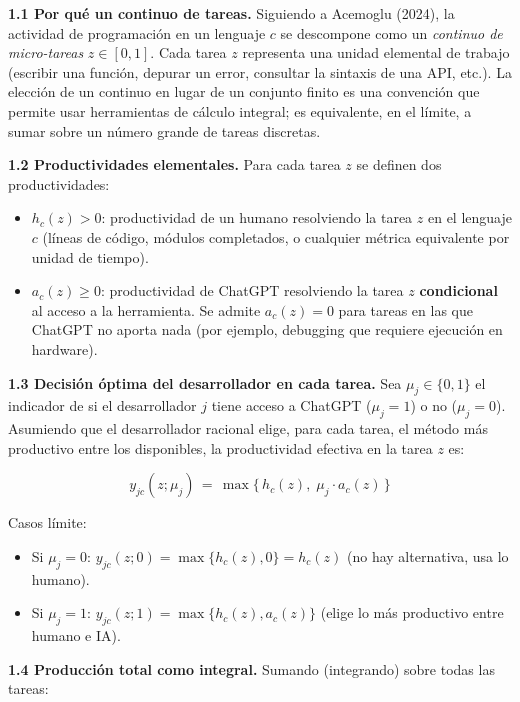 \documentclass[11pt,a4paper]{article}
\theoremstyle{definition}
\begin{document}
\textbf{1.1 Por qué un continuo de tareas.} Siguiendo a Acemoglu (2024), la actividad de programación en un lenguaje $c$ se descompone como un \textit{continuo de micro-tareas} $z \in [0, 1]$. Cada tarea $z$ representa una unidad elemental de trabajo (escribir una función, depurar un error, consultar la sintaxis de una API, etc.). La elección de un continuo en lugar de un conjunto finito es una convención que permite usar herramientas de cálculo integral; es equivalente, en el límite, a sumar sobre un número grande de tareas discretas.

\textbf{1.2 Productividades elementales.} Para cada tarea $z$ se definen dos productividades:

\begin{itemize}[leftmargin=*]
  \item $h_c(z) > 0$: productividad de un humano resolviendo la tarea $z$ en el lenguaje $c$ (líneas de código, módulos completados, o cualquier métrica equivalente por unidad de tiempo).
  \item $a_c(z) \geq 0$: productividad de ChatGPT resolviendo la tarea $z$ \textbf{condicional} al acceso a la herramienta. Se admite $a_c(z) = 0$ para tareas en las que ChatGPT no aporta nada (por ejemplo, debugging que requiere ejecución en hardware).
\end{itemize}

\textbf{1.3 Decisión óptima del desarrollador en cada tarea.} Sea $\mu_j \in \{0, 1\}$ el indicador de si el desarrollador $j$ tiene acceso a ChatGPT ($\mu_j = 1$) o no ($\mu_j = 0$). Asumiendo que el desarrollador racional elige, para cada tarea, el método más productivo entre los disponibles, la productividad efectiva en la tarea $z$ es:

\begin{equation}
y_{jc}(z;\mu_j) \,=\, \max\!\bigl\{\,h_c(z),\; \mu_j\cdot a_c(z)\,\bigr\}
\label{eq:paso1_tarea}
\end{equation}

Casos límite:
\begin{itemize}[leftmargin=*]
  \item Si $\mu_j = 0$: \;\; $y_{jc}(z;0) = \max\{h_c(z), 0\} = h_c(z)$ \;\; (no hay alternativa, usa lo humano).
  \item Si $\mu_j = 1$: \;\; $y_{jc}(z;1) = \max\{h_c(z), a_c(z)\}$ \;\; (elige lo más productivo entre humano e IA).
\end{itemize}

\textbf{1.4 Producción total como integral.} Sumando (integrando) sobre todas las tareas:
\end{document}
